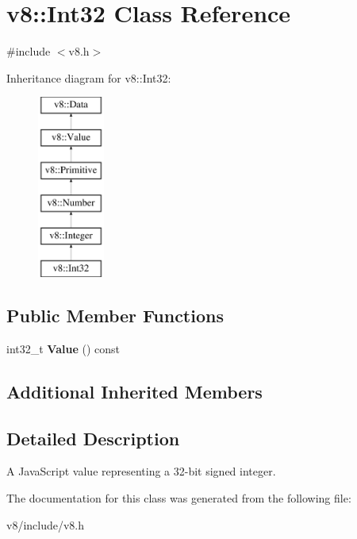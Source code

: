 \hypertarget{classv8_1_1Int32}{\section{v8\-:\-:Int32 Class Reference}
\label{classv8_1_1Int32}
}


{\ttfamily \#include $<$v8.\-h$>$}

Inheritance diagram for v8\-:\-:Int32\-:\begin{figure}[H]
\begin{center}
\leavevmode
\includegraphics[height=6.000000cm]{classv8_1_1Int32}
\end{center}
\end{figure}
\subsection*{Public Member Functions}
\begin{DoxyCompactItemize}
\item 
\hypertarget{classv8_1_1Int32_a74860c6a524e1fb3f7b685ab0896be4b}{int32\-\_\-t {\bfseries Value} () const }\label{classv8_1_1Int32_a74860c6a524e1fb3f7b685ab0896be4b}

\end{DoxyCompactItemize}
\subsection*{Additional Inherited Members}


\subsection{Detailed Description}
A Java\-Script value representing a 32-\/bit signed integer. 

The documentation for this class was generated from the following file\-:\begin{DoxyCompactItemize}
\item 
v8/include/v8.\-h\end{DoxyCompactItemize}
